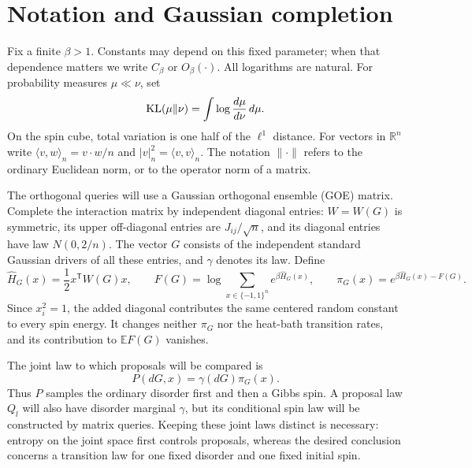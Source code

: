 \section{Notation and Gaussian completion}\label{sec:setup}

Fix a finite $\beta>1$. Constants may depend on this fixed parameter;
when that dependence matters we write $C_\beta$ or $O_\beta(\cdot)$.
All logarithms are natural. For probability measures $\mu\ll\nu$, set
\[
 {\rm KL}(\mu\Vert\nu)=\int\log\frac{d\mu}{d\nu}\,d\mu.
\]
On the spin cube, total variation is one half of the $\ell^1$ distance.
For vectors in $\mathbb R^n$ write
$\langle v,w\rangle_n=v\cdot w/n$ and
$|v|_n^2=\langle v,v\rangle_n$. The notation $\|\cdot\|$ refers to
the ordinary Euclidean norm, or to the operator norm of a matrix.

The orthogonal queries will use a Gaussian orthogonal ensemble (GOE)
matrix. Complete the interaction matrix by independent diagonal
entries: $W=W(G)$ is symmetric, its upper off-diagonal entries are
$J_{ij}/\sqrt n$, and its diagonal entries have law $N(0,2/n)$.
The vector $G$ consists of the independent standard Gaussian drivers
of all these entries, and $\gamma$ denotes its law. Define
\[
 \widehat H_G(x)=\frac12x^{\mathsf T}W(G)x,
 \qquad F(G)=\log\sum_{x\in\{-1,1\}^n}e^{\beta\widehat H_G(x)},
 \qquad \pi_G(x)=e^{\beta\widehat H_G(x)-F(G)}.
\]
Since $x_i^2=1$, the added diagonal contributes the same centered
random constant to every spin energy. It changes neither $\pi_G$
nor the heat-bath transition rates, and its contribution to
$\mathbb E F(G)$ vanishes.

The joint law to which proposals will be compared is
\[
 P(dG,x)=\gamma(dG)\pi_G(x).
\]
Thus $P$ samples the ordinary disorder first and then a Gibbs spin.
A proposal law $Q_l$ will also have disorder marginal $\gamma$, but
its conditional spin law will be constructed by matrix queries.
Keeping these joint laws distinct is necessary: entropy on the joint
space first controls proposals, whereas the desired conclusion concerns
a transition law for one fixed disorder and one fixed initial spin.

